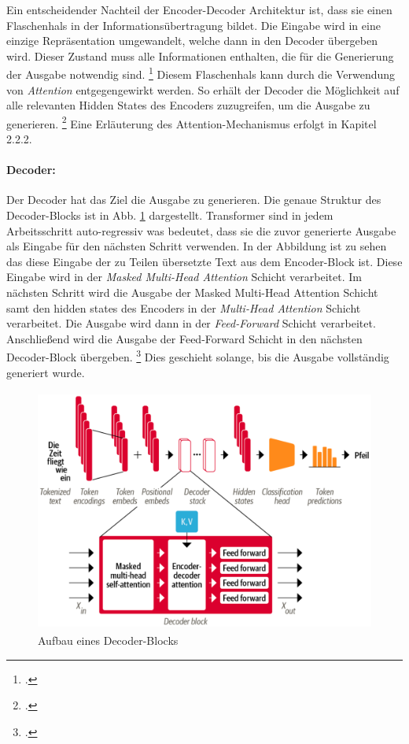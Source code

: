 Ein entscheidender Nachteil der Encoder-Decoder Architektur ist, dass sie einen Flaschenhals in der Informationsübertragung bildet. Die Eingabe wird in eine einzige Repräsentation umgewandelt, welche dann in den Decoder übergeben wird. Dieser Zustand muss alle Informationen enthalten, die für die Generierung der Ausgabe notwendig sind. \footcites[Vgl.][S. 6 ff.]{tunstall_natural_2022} Diesem Flaschenhals kann durch die Verwendung von \emph{Attention} entgegengewirkt werden. So erhält der Decoder die Möglichkeit auf alle relevanten Hidden States des Encoders zuzugreifen, um die Ausgabe zu generieren. \footcites[Vgl.][S. 9]{bahdanau_neural_2014} Eine Erläuterung des Attention-Mechanismus erfolgt in Kapitel 2.2.2.

\paragraph{Decoder:} 
 Der Decoder hat das Ziel die Ausgabe zu generieren. Die genaue Struktur des Decoder-Blocks ist in Abb. \ref{fig:decoder-block} dargestellt. Transformer sind in jedem Arbeitsschritt auto-regressiv was bedeutet, dass sie die zuvor generierte Ausgabe als Eingabe für den nächsten Schritt verwenden. In der Abbildung ist zu sehen das diese Eingabe der zu Teilen übersetzte Text aus dem Encoder-Block ist. Diese Eingabe wird in der \emph{Masked Multi-Head Attention} Schicht verarbeitet. Im nächsten Schritt wird die Ausgabe der Masked Multi-Head Attention Schicht samt den hidden states des Encoders in der \emph{Multi-Head Attention} Schicht verarbeitet. Die Ausgabe wird dann in der \emph{Feed-Forward} Schicht verarbeitet. Anschließend wird die Ausgabe der Feed-Forward Schicht in den nächsten Decoder-Block übergeben. \footcites[Vgl.][S. 3 ff.]{vaswani_attention_2017} Dies geschieht solange, bis die Ausgabe vollständig generiert wurde.
 \begin{figure}[h]
    \centering
    \includegraphics[height=80mm]{graphics/decoder-block.png}
    \caption[Aufbau eines Decoder-Blocks]{Aufbau eines Decoder-Blocks \footnotemark}
    \label{fig:decoder-block}
\end{figure}

